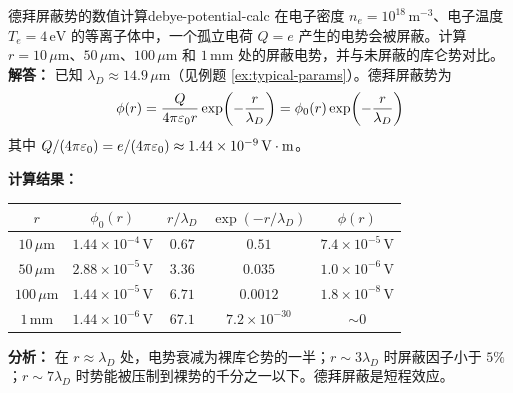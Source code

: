 \begin{example}{德拜屏蔽势的数值计算}{debye-potential-calc}
在电子密度 $n_e=10^{18}\,\mathrm{m}^{-3}$、电子温度 $T_e=4\,\mathrm{eV}$ 的等离子体中，一个孤立电荷 $Q=e$ 产生的电势会被屏蔽。计算 $r=10\,\mu\mathrm{m}$、$50\,\mu\mathrm{m}$、$100\,\mu\mathrm{m}$ 和 $1\,\mathrm{mm}$ 处的屏蔽电势，并与未屏蔽的库仑势对比。
\tcblower
\textbf{解答：}
已知 $\lambda_D\approx 14.9\,\mu\mathrm{m}$（见例题 \ref{ex:typical-params}）。德拜屏蔽势为
\[
\phi(r) = \frac{Q}{4\pi\varepsilon_0 r}\exp\!\left(-\frac{r}{\lambda_D}\right) = \phi_0(r)\exp\!\left(-\frac{r}{\lambda_D}\right)
\]
其中 $Q/(4\pi\varepsilon_0)=e/(4\pi\varepsilon_0)\approx 1.44\times 10^{-9}\,\mathrm{V\cdot m}$。

\textbf{计算结果：}
\begin{center}
\begin{tabular}{ccccc}
\hline
$r$ & $\phi_0(r)$ & $r/\lambda_D$ & $\exp(-r/\lambda_D)$ & $\phi(r)$ \\
\hline
$10\,\mu\mathrm{m}$ & $1.44\times 10^{-4}\,\mathrm{V}$ & $0.67$ & $0.51$ & $7.4\times 10^{-5}\,\mathrm{V}$ \\
$50\,\mu\mathrm{m}$ & $2.88\times 10^{-5}\,\mathrm{V}$ & $3.36$ & $0.035$ & $1.0\times 10^{-6}\,\mathrm{V}$ \\
$100\,\mu\mathrm{m}$ & $1.44\times 10^{-5}\,\mathrm{V}$ & $6.71$ & $0.0012$ & $1.8\times 10^{-8}\,\mathrm{V}$ \\
$1\,\mathrm{mm}$ & $1.44\times 10^{-6}\,\mathrm{V}$ & $67.1$ & $7.2\times 10^{-30}$ & $\sim 0$ \\
\hline
\end{tabular}
\end{center}

\textbf{分析：} 在 $r\approx\lambda_D$ 处，电势衰减为裸库仑势的一半；$r\sim 3\lambda_D$ 时屏蔽因子小于 $5\%$；$r\sim 7\lambda_D$ 时势能被压制到裸势的千分之一以下。德拜屏蔽是短程效应。
\end{example}

